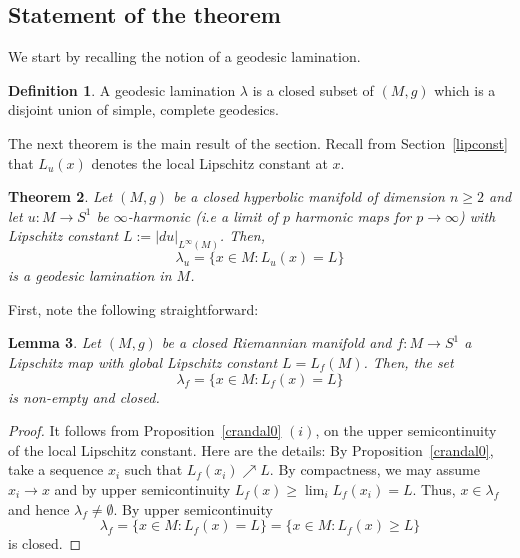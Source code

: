 \documentclass{ip-journal}
\newtheorem{theorem}{Theorem}[section]
\newtheorem{lemma}[theorem]{Lemma}
\theoremstyle{definition}
\newtheorem{definition}[theorem]{Definition}
\numberwithin{equation}{section}
\begin{document}
\subsection{Statement of the theorem} We start by recalling the notion of a geodesic lamination.
%

\begin{definition}A geodesic lamination $\lambda$ is a closed subset of  $(M, g)$   which is a disjoint union of simple, complete geodesics. 
\end{definition}

The next theorem is the main result of the section. Recall from Section~\ref{lipconst} that $L_u(x)$ denotes the  local Lipschitz constant at $x$.


\begin{theorem}\label{straightline} Let  $(M, g)$ be a closed hyperbolic manifold of dimension $n \geq 2$   and let $ u: M \rightarrow S^1$ be $\infty$-harmonic (i.e a limit of $p$ harmonic maps for $p \rightarrow \infty$) with  Lipschitz constant $L:=|du|_{L^\infty(M)}$. Then,
\[
 \lambda_u=\{ x \in M: L_u(x)= L \} 
\]
is a geodesic lamination in $M$.
\end{theorem}

First, note the following straightforward:
\begin{lemma} \label{realized} Let  $(M, g)$ be a closed Riemannian manifold  and $ f: M \rightarrow S^1$ a  Lipschitz map  with global Lipschitz constant $L=L_f(M)$. Then, the set
\[
 \lambda_f=\{ x \in M: L_f(x)= L \} 
\]
is non-empty and closed.
\end{lemma}
\begin{proof} It follows  from Proposition~\ref{crandal0} $(i)$, on the upper semicontinuity of the local Lipschitz constant. Here are the details: By Proposition~\ref{crandal0}, take a sequence $x_i$ such that  $L_f(x_i) \nearrow L$. By compactness, we may assume $ x_i \rightarrow x$ and by upper semicontinuity $L_f(x) \geq \lim_i L_f(x_i) = L$. Thus, $x \in  \lambda_f$ and hence $ \lambda_f \neq \emptyset$. By  upper semicontinuity 
\[
 \lambda_f=\{ x \in M: L_f(x)= L \}=\{ x \in M: L_f(x) \geq L \} 
\]
is closed.
\end{proof}
\end{document}
